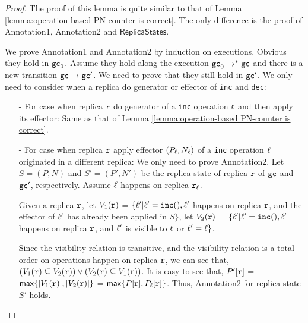 \begin {proof}

The proof of this lemma is quite similar to that of Lemma \ref{lemma:operation-based PN-counter is correct}. The only difference is the proof of Annotation1, Annotation2 and $\mathsf{ReplicaStates}$.




We prove Annotation1 and Annotation2 by induction on executions. Obvious they hold in $\aglobalstate_0$. Assume they hold along the execution $\aglobalstate_0 \xrightarrow{}^* \aglobalstate$ and there is a new transition $\aglobalstate \xrightarrow{} \aglobalstate'$. We need to prove that they still hold in $\aglobalstate'$. We only need to consider when a replica do generator or effector of {\tt inc} and {\tt dec}:

\begin{itemize}
\setlength{\itemsep}{0.5pt}
\item[-] For case when replica $\arep$ do generator of a {\tt inc} operation $\alabel$ and then apply its effector: Same as that of Lemma \ref{lemma:operation-based PN-counter is correct}.

\item[-] For case when replica $\arep$ apply effector $(P_{\alabel},N_{\alabel})$ of a {\tt inc} operation $\alabel$ originated in a different replica: We only need to prove Annotation2. Let $S=(P,N)$ and $S'=(P',N')$ be the replica state of replica $\arep$ of $\aglobalstate$ and $\aglobalstate'$, respectively. Assume $\alabel$ happens on replica $\arep_{\alabel}$.

    Given a replica $\arep$, let $V_1(\arep)$ =  $\{ \alabel' \vert \alabel' = \alabelshort[{\tt inc}]{}, \alabel'$ happens on replica $\arep$, and the effector of $\alabel'$ has already been applied in $S \}$, let $V_2(\arep)$ =  $\{ \alabel' \vert \alabel' = \alabelshort[{\tt inc}]{}, \alabel'$ happens on replica $\arep$, and $\alabel'$ is visible to $\alabel$ or $\alabel' = \alabel\}$.

    Since the visibility relation is transitive, and the visibility relation is a total order on operations happen on replica $\arep$, we can see that, $( V_1(\arep) \subseteq V_2(\arep) ) \vee ( V_2(\arep) \subseteq V_1(\arep) )$. It is easy to see that, $P'[\arep]$ = $\mathsf{max}\{ \vert V_1(\arep) \vert ,\vert V_2(\arep) \vert \}$ = $\mathsf{max}\{ P[\arep], P_{\alabel}[\arep] \}$. Thus, Annotation2 for replica state $S'$ holds.


\end{itemize}
\end{proof}
